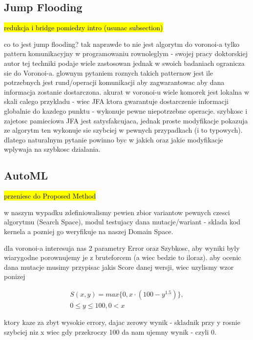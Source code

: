 \documentclass{article}
\begin{document}
\subsection{Jump Flooding} %

\hl{redukcja i bridge pomiedzy intro (usunac subsection)}

co to jest jump flooding? tak naprawde to nie jest algorytm do voronoi-a tylko
pattern komunikacyjny w programowaniu rownoleglym - swojej pracy doktorskiej
autor tej techniki podaje wiele zastosowan jednak w swoich badaniach ogranicza
sie do Voronoi-a. glownym pytaniem roznych takich patternow jest ile potrzebnych
jest rund/operacji komunikacji aby zagwarantowac aby dana informacja zostanie
dostarczona. akurat w voronoi-u wiele komorek jest lokalna w skali calego
przykladu - wiec JFA ktora gwarantuje dostarczenie informacji globalnie do
kazdego punktu - wykonuje pewne niepotrzebne operacje.  szybkosc i zajetosc
pamieciowa JFA jest satysfakcujaca, jednak proste modyfikacje pokazuja ze
algorytm ten wykonuje sie szybciej w pewnych przypadkach (i to typowych).
dlatego naturalnym pytanie powinno byc w jakich oraz jakie modyfikacje wplywaja
na szybkosc dzialania.

\subsection{AutoML} %

\hl{przeniesc do Proposed Method}

w naszym wypadku zdefiniowalismy pewien zbior variantow pewnych czesci
algorytmu (Search Space), modul testujacy dana mutacje/wariant - sklada kod kernela a pozniej go weryfikuje na naszej Domain Space.

dla voronoi-a interesuja nas 2 parametry Error oraz Szybkosc, aby wyniki byly
wiarygodne porownujemy je z bruteforcem (a wiec bedzie to iloraz).
aby ocenic dana mutacje musimy przypisac jakis Score danej wersji, wiec uzylismy
wzor ponizej

\begin{align}
S(x,y) = max\{0, x \cdot (100-y^{1.5})\}, \\
0 \leq y \leq 100, 0 < x
\end{align}

ktory kaze za zbyt wysokie errory, dajac zerowy wynik - skladnik przy y rosnie
szybciej niz x wiec gdy przekroczy 100 da nam ujemny wynik - czyli 0.
\end{document}
